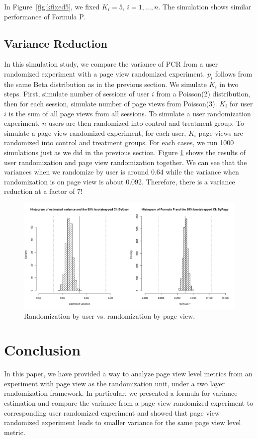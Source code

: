\documentclass[11pt]{asaproc}
\begin{document}
In Figure~\ref{fig:kfixed5}, we fixed $K_i=5$, $i=1,\dots, n$. The simulation shows similar performance of Formula P.

\subsection{Variance Reduction}
In this simulation study, we compare the variance of PCR from a user randomized experiment with a page view randomized experiment. $p_i$ follows from the same Beta distribution as in the previous section. We simulate $K_i$ in two steps. First, simulate number of sessions of user $i$ from a Poisson(2) distribution, then for each session, simulate number of page views from Poisson(3). $K_i$ for user $i$ is the sum of all page views from all sessions. To simulate a user randomization experiment, $n$ users are then randomized into control and treatment group. To simulate a page view randomized experiment, for each user, $K_i$ page views are randomized into control and treatment groups. For each cases, we run 1000 simulations just as we did in the previous section. Figure \ref{fig:compare} shows the results of user randomization and page view randomization together. We can see that the variances when we randomize by user is around 0.64 while the variance when randomization is on page view is about 0.092. Therefore, there is a variance reduction at a factor of 7!

\begin{figure}[!htbp]
  \centering
  \includegraphics[width=\textwidth]{jsmpreceding_compare}
    \caption{Randomization by user vs. randomization by page view.}
  \label{fig:compare}
\end{figure}


\section{Conclusion}\label{compare}
In this paper, we have provided a way to analyze page view level metrics from an experiment with page view as the randomization unit, under a two layer randomization framework. In particular, we presented a formula for variance estimation and compare the variance from a page view randomized experiment to corresponding user randomized experiment and showed that page view randomized experiment leads to smaller variance for the same page view level metric. 
\end{document}
